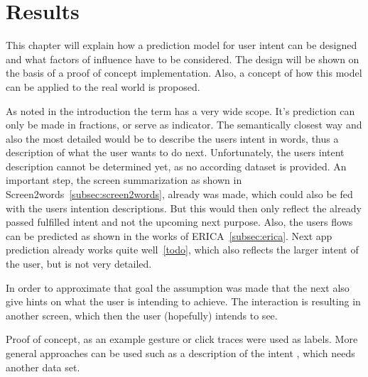 \chapter{Results}

%

This chapter will explain how a prediction model for user intent can be designed and what factors of influence have to be considered.
The design will be shown on the basis of a proof of concept implementation.
Also, a concept of how this model can be applied to the real world is proposed. 

As noted in the introduction the term  has a very wide scope.
It's prediction can only be made in fractions, or serve as indicator.
The semantically closest way and also the most detailed would be to describe the users intent in words, thus a description of what the user wants to do next.
Unfortunately, the users intent description cannot be determined yet, as no according dataset is provided.
An important step, the screen summarization as shown in Screen2words~\ref{subsec:screen2words}, already was made, which could also be fed with the users intention descriptions.
But this would then only reflect the already passed fulfilled intent and not the upcoming next purpose.
Also, the users flows can be predicted as shown in the works of ERICA~\ref{subsec:erica}.
Next app prediction already works quite well~\ref{todo}, which also reflects the larger intent of the user, but is not very detailed.

In order to approximate that goal the assumption was made that the next  also give hints on what the user is intending to achieve.
The interaction is resulting in another screen, which then the user (hopefully) intends to see.


Proof of concept, as an example gesture or click traces were used as labels.
More general approaches can be used such as a description of the intent \cite{wang2021screen2words}, which needs another data set.

